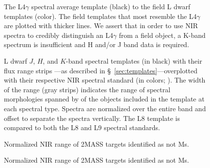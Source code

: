 \documentclass[12pt,preprint]{aastex}
\begin{document}
\begin{figure}
	\caption{The L4$\gamma$ spectral average template (black) to the field L dwarf templates (color). The field templates that most resemble the L4$\gamma$ are plotted with thicker lines. We assert that in order to use NIR spectra to credibly distinguish an L4$\gamma$ from a field object, a K-band spectrum is insufficient and H and/or J band data is required.}
	\label{fig:L4lg-field}
\end{figure}


\clearpage

\begin{figure}
		\caption{
	L dwarf $J$, $H$, and $K$-band spectral templates (in black) with their flux range strips ---as described in \S~\ref{sec:templates}---overplotted with their respective NIR spectral standard (in colors; \cite{Kirkpatrick10}). 
	The width of the range (gray strips) indicates the range of spectral morphologies spanned by of the objects included in the template at each spectral type.
	Spectra are normalized over the entire band and offset to separate the spectra vertically.
	The L8 template is compared to both the L8 and L9 spectral standards. }
	\label{fig:templates-stds}
\end{figure}


\begin{figure}
	\caption{Normalized NIR range of 2MASS targets identified as not Ms.}
	\label{fig:notMs_1}
\end{figure}

\begin{figure}
	\caption{Normalized NIR range of 2MASS targets identified as not Ms.}
\end{figure}
\end{document}
